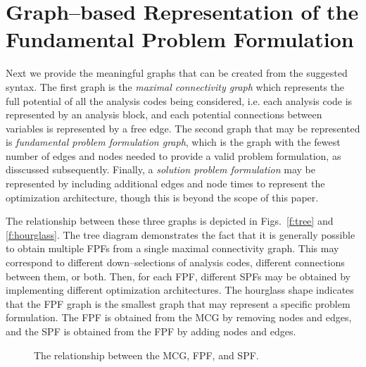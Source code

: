 \section{Graph--based Representation of the Fundamental Problem Formulation}
Next we provide the meaningful graphs that can be created from the suggested syntax. The first graph is the \emph{maximal connectivity graph} which represents the full potential of all the analysis codes being considered, i.e. each analysis code is represented by an analysis block, and each potential connections between variables is represented by a free edge. The second graph that may be represented is \emph{fundamental problem formulation graph}, which is the graph with the fewest number of edges and nodes needed to provide a valid problem formulation, as disscussed subsequently. Finally, a \emph{solution problem formulation} may be represented by including additional edges and node times to represent the optimization architecture, though this is beyond the scope of this paper. 

The relationship between these three graphs is depicted in Figs.~\ref{f:tree} and \ref{f:hourglass}. The tree diagram demonstrates the fact that it is generally possible to obtain multiple FPFs from a single maximal connectivity graph. This  may correspond to different down--selections of analysis codes, different connections between them, or both. Then, for each FPF, different SPFs may be obtained by implementing different optimization architectures. The hourglass shape indicates that the FPF graph is the smallest graph that may represent a specific problem formulation. The FPF is obtained from the MCG by removing nodes and edges, and the SPF is obtained from the FPF by adding nodes and edges.
\begin{figure}[htb!]
	\centering
\caption{The relationship between the MCG, FPF, and SPF.}
\end{figure}

